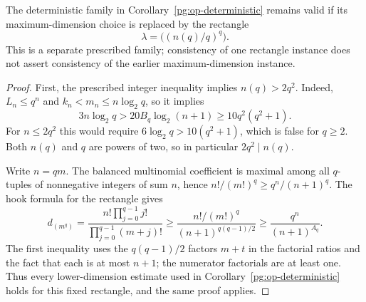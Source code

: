 \begin{corollary}
\label{pg:op-rectangle}
The deterministic family in Corollary~\ref{pg:op-deterministic} remains
valid if its maximum-dimension choice is replaced by the rectangle
\[
 \lambda=\bigl((n(q)/q)^q\bigr).
 \tag{PG-OP-rectangle}
\]
This is a separate prescribed family; consistency of one rectangle
instance does not assert consistency of the earlier maximum-dimension
instance.
\end{corollary}
\begin{proof}
First, the prescribed integer inequality implies $n(q)>2q^2$. Indeed,
$L_n\leq q^n$ and $k_n<m_n\leq n\log_2q$, so it implies
\[
 3n\log_2q>20B_q\log_2(n+1)
                 \geq10q^2(q^2+1).
\]
For $n\leq2q^2$ this would require
$6\log_2q>10(q^2+1)$, which is false for $q\geq2$.
Both $n(q)$ and $q$ are powers of two, so in particular
$2q^2\mid n(q)$.

Write $n=qm$. The balanced multinomial coefficient is maximal among all
$q$-tuples of nonnegative integers of sum $n$, hence
$n!/(m!)^q\geq q^n/(n+1)^q$. The hook formula for the rectangle gives
\[
 d_{(m^q)}=
 \frac{n!\prod_{j=0}^{q-1}j!}{\prod_{j=0}^{q-1}(m+j)!}
 \geq\frac{n!/(m!)^q}{(n+1)^{q(q-1)/2}}
 \geq\frac{q^n}{(n+1)^{A_q}}.
\]
The first inequality uses the $q(q-1)/2$ factors $m+t$ in the
factorial ratios and the fact that each is at most $n+1$; the numerator
factorials are at least one. Thus every lower-dimension estimate used in
Corollary~\ref{pg:op-deterministic} holds for this fixed rectangle, and
the same proof applies.
\end{proof}

